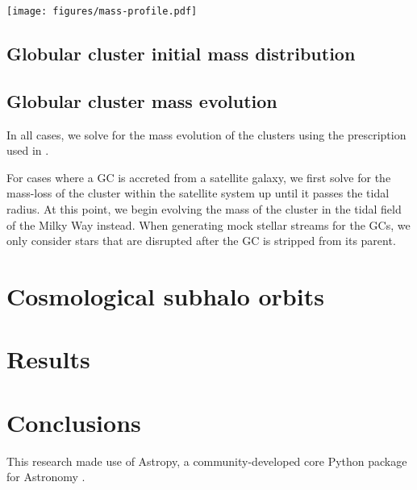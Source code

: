 \documentclass[manuscript, letterpaper]{aastex6}
\begin{document}
\begin{figure*}[p]
\begin{center}
\texttt{[image: figures/mass-profile.pdf]}
\end{center}
\caption{%
\label{fig:mass-profile}}
\end{figure*}

\subsection{Globular cluster initial mass distribution} \label{sec:gcmassdist}

\subsection{Globular cluster mass evolution} \label{sec:gcmassevolution}

In all cases, we solve for the mass evolution of the clusters using the
prescription used in \citet{Gnedin:2014}.

For cases where a GC is accreted from a satellite galaxy, we first solve for
the mass-loss of the cluster within the satellite system up until it passes the
tidal radius.
At this point, we begin evolving the mass of the cluster in the tidal field of
the Milky Way instead.
When generating mock stellar streams for the GCs, we only consider stars that
are disrupted after the GC is stripped from its parent.

\section{Cosmological subhalo orbits} \label{sec:aqorbits}

\section{Results}

\subsection{}

\section{Conclusions}\label{sec:conclusions}

\acknowledgements
This research made use of
Astropy, a community-developed core Python package for Astronomy
\citep{Astropy-Collaboration:2013}.



\end{document}
